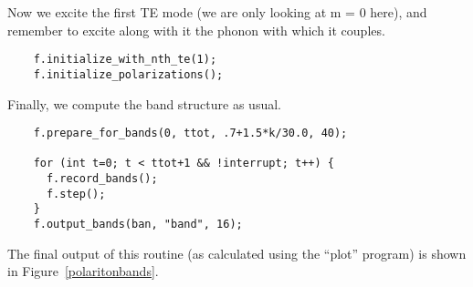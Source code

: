 Now we excite the first TE mode (we are only looking at m = 0 here), and
remember to excite along with it the phonon with which it couples.

\begin{verbatim}
    f.initialize_with_nth_te(1);
    f.initialize_polarizations();
\end{verbatim}

Finally, we compute the band structure as usual.

\begin{verbatim}
    f.prepare_for_bands(0, ttot, .7+1.5*k/30.0, 40);
    
    for (int t=0; t < ttot+1 && !interrupt; t++) {
      f.record_bands();
      f.step();
    }
    f.output_bands(ban, "band", 16);
\end{verbatim}
\begin{comment}
    fflush(ban);
  }
  fclose(ban);
}
\end{comment}

The final output of this routine (as calculated using the ``plot'' program)
is shown in Figure~\ref{polaritonbands}.
